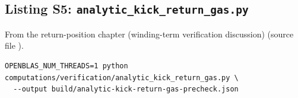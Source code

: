 \subsection*{Listing S5: \texttt{analytic\_kick\_return\_gas.py}}
From the return-position chapter (winding-term verification discussion) (source file ).
\begin{verbatim}
OPENBLAS_NUM_THREADS=1 python computations/verification/analytic_kick_return_gas.py \
  --output build/analytic-kick-return-gas-precheck.json
\end{verbatim}
